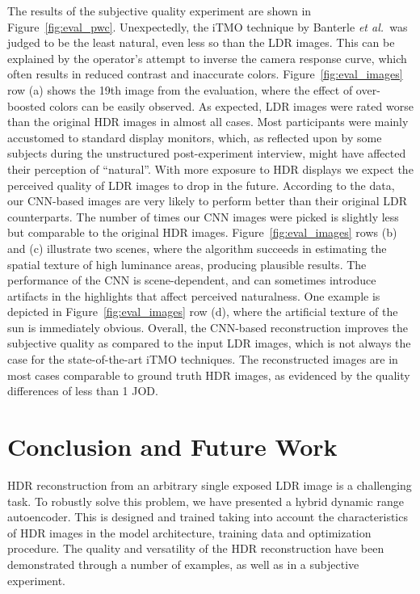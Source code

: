 \documentclass[acmtog]{acmart}
\newcommand{\figref}[1]{Figure~\ref{fig:#1}}
\newcommand{\etal}{\emph{et al.\ }}
\begin{document}
The results of the subjective quality experiment are shown in \figref{eval_pwc}. Unexpectedly, the iTMO technique by Banterle \etal was judged to be the least natural, even less so than the LDR images. This can be explained by the operator's attempt to inverse the camera response curve, which often results in reduced contrast and inaccurate colors. \figref{eval_images} row (a) shows the 19th image from the evaluation, where the effect of over-boosted colors can be easily observed.
As expected, LDR images were rated worse than the original HDR images in almost all cases. Most participants were mainly accustomed to standard display monitors, which, as reflected upon by some subjects during the unstructured post-experiment interview, might have affected their perception of ``natural''. With more exposure to HDR displays we expect the perceived quality of LDR images to drop in the future. 
According to the data, our CNN-based images are very likely to perform better than their original LDR counterparts. The number of times our CNN images were picked is slightly less but comparable to the original HDR images. \figref{eval_images} rows (b) and (c) illustrate two scenes, where the algorithm succeeds in estimating the spatial texture of high luminance areas, producing plausible results.
The performance of the CNN is scene-dependent, and can sometimes introduce artifacts in the highlights that affect perceived naturalness. 
One example is depicted in \figref{eval_images} row (d), where the artificial texture of the sun is immediately obvious. Overall, the CNN-based reconstruction improves the subjective quality as compared to the input LDR images, which is not always the case for the state-of-the-art iTMO techniques. The reconstructed images are in most cases comparable to ground truth HDR images, as evidenced by the  quality differences of less than 1 JOD.
 
\section{Conclusion and Future Work}\label{sec:conclusion}
HDR reconstruction from an arbitrary single exposed LDR image is a challenging task. To robustly solve this problem, we have presented a hybrid dynamic range autoencoder. This is designed and trained taking into account the characteristics of HDR images in the model architecture, training data and optimization procedure. The quality and versatility of the HDR reconstruction have been demonstrated through a number of examples, as well as in a subjective experiment.
\end{document}
